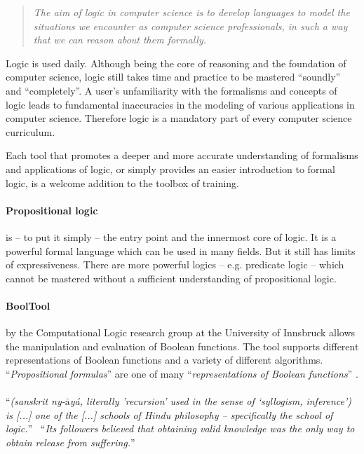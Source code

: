 
\begin{quote}
\em The aim of logic in computer science is to develop languages 
to model the situations we encounter as computer science professionals, 
in such a way that we can reason about them formally. \cite[p.1]{Huth:2004:LCS:975331}
\end{quote}

Logic is used daily. Although being the core of reasoning and the foundation of computer science, 
logic still takes time and practice to be mastered “soundly” and “completely”. 
A user’s unfamiliarity with the formalisms and concepts of logic leads to fundamental inaccuracies 
in the modeling of various applications in computer science. 
Therefore logic is a mandatory part of every computer science curriculum. 

Each tool that promotes a deeper and more accurate understanding of formalisms and applications of logic,
or simply provides an easier introduction to formal logic, 
is a welcome addition to the toolbox of training.


\paragraph{Propositional logic}is – to put it simply – the entry point and the innermost core of logic. 
It is a powerful formal language which can be used in many fields. 
But it still has limits of expressiveness.
There are more powerful logics – e.g. predicate logic –
which cannot be mastered without a sufficient understanding of propositional logic.

\paragraph{BoolTool}by the Computational Logic research group at the University of Innsbruck allows the manipulation and evaluation of Boolean functions. The tool supports different representations of Boolean functions and a variety of different algorithms.
“{\em Propositional formulas}” are one of many “{\em representations of Boolean functions}” \cite[p.159]{Huth:2004:LCS:975331}.

\paragraph{\Nyaya}“{\em (sanskrit ny-$\bar{\mbox{a}}$yá, literally 'recursion’  used in the sense of  ‘syllogism, inference’) is [...] one of the [...] schools of Hindu philosophy – specifically the school of logic.}”\ \cite{WIKIPEDIA:NYAYA}
“{\em{}Its followers believed that obtaining valid knowledge was the only way  to obtain release from suffering.}”\ \cite{IEP:NYAYA} 

